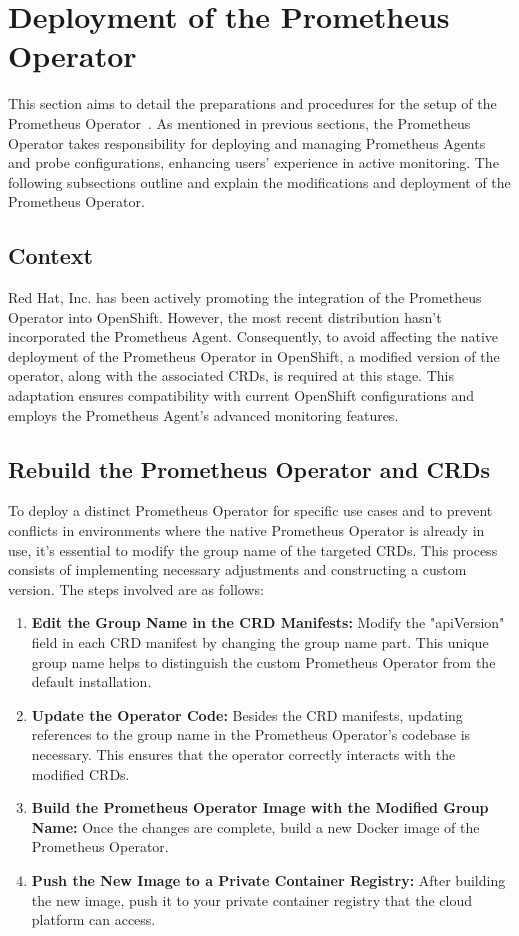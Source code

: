 \section{Deployment of the Prometheus Operator}

This section aims to detail the preparations and procedures for the setup of the Prometheus Operator~\parencite{PrometheusOperator}. As mentioned in previous sections, the Prometheus Operator takes responsibility for deploying and managing Prometheus Agents~\parencite{PrometheusAgentSupport} and probe configurations, enhancing users' experience in active monitoring. The following subsections outline and explain the modifications and deployment of the Prometheus Operator. 

\subsection{Context}

Red Hat, Inc. has been actively promoting the integration of the Prometheus Operator into OpenShift. However, the most recent distribution hasn't incorporated the Prometheus Agent. Consequently, to avoid affecting the native deployment of the Prometheus Operator in OpenShift, a modified version of the operator, along with the associated \ac{CRD}s, is required at this stage. This adaptation ensures compatibility with current OpenShift configurations and employs the Prometheus Agent's advanced monitoring features. 

\subsection{Rebuild the Prometheus Operator and CRDs}

To deploy a distinct Prometheus Operator for specific use cases and to prevent conflicts in environments where the native Prometheus Operator is already in use, it's essential to modify the group name of the targeted \ac{CRD}s. This process consists of implementing necessary adjustments and constructing a custom version. The steps involved are as follows: 

\begin{enumerate}
    \item \textbf{Edit the Group Name in the \ac{CRD} Manifests:} Modify the "apiVersion" field in each \ac{CRD} manifest by changing the group name part. This unique group name helps to distinguish the custom Prometheus Operator from the default installation. 
    \item \textbf{Update the Operator Code:} Besides the \ac{CRD} manifests, updating references to the group name in the Prometheus Operator's codebase is necessary. This ensures that the operator correctly interacts with the modified \ac{CRD}s. 
    \item \textbf{Build the Prometheus Operator Image with the Modified Group Name:} Once the changes are complete, build a new Docker image of the Prometheus Operator. 
    \item \textbf{Push the New Image to a Private Container Registry:} After building the new image, push it to your private container registry that the cloud platform can access. 
\end{enumerate}

